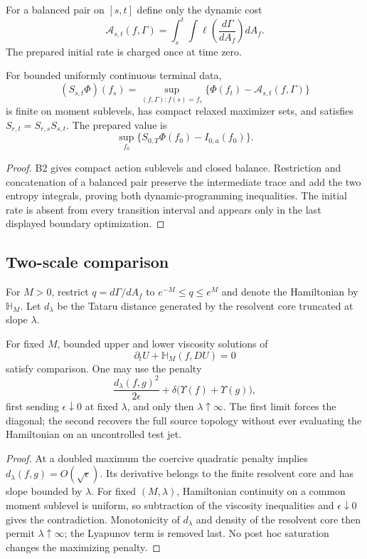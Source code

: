 For a balanced pair on $[s,t]$ define only the dynamic cost
\[
 \mathcal A_{s,t}(f,\Gamma)
 =\int_s^t\!\int
 \ell\left(\frac{d\Gamma}{dA_f}\right)dA_f.
\]
The prepared initial rate is charged once at time zero.

\begin{theorem}
\label{thm:r10-b4-action}
For bounded uniformly continuous terminal data,
\[
 (S_{s,t}\Phi)(f_s)
 =\sup_{(f,\Gamma):f(s)=f_s}
 \{\Phi(f_t)-\mathcal A_{s,t}(f,\Gamma)\}
\]
is finite on moment sublevels, has compact relaxed maximizer sets, and
satisfies $S_{r,t}=S_{r,s}S_{s,t}$.  The prepared value is
\[
 \sup_{f_0}\{S_{0,T}\Phi(f_0)-I_{0,a}(f_0)\}.
\]
\end{theorem}

\begin{proof}
B2 gives compact action sublevels and closed balance.  Restriction and
concatenation of a balanced pair preserve the intermediate trace and add the
two entropy integrals, proving both dynamic-programming inequalities.  The
initial rate is absent from every transition interval and appears only in the
last displayed boundary optimization.
\end{proof}

\subsection{Two-scale comparison}

For $M>0$, restrict $q=d\Gamma/dA_f$ to
$e^{-M}\le q\le e^M$ and denote the Hamiltonian by $\mathbb H_M$.  Let
$d_\lambda$ be the Tataru distance generated by the resolvent core truncated
at slope $\lambda$.

\begin{theorem}
\label{thm:r10-b4-comparison}
For fixed $M$, bounded upper and lower viscosity solutions of
\[
 \partial_tU+\mathbb H_M(f,DU)=0
\]
satisfy comparison.  One may use the penalty
\[
 \frac{d_\lambda(f,g)^2}{2\epsilon}
 +\delta\bigl(\Upsilon(f)+\Upsilon(g)\bigr),
\]
first sending $\epsilon\downarrow0$ at fixed $\lambda$, and only then
$\lambda\uparrow\infty$.  The first limit forces the diagonal; the second
recovers the full source topology without ever evaluating the Hamiltonian on
an uncontrolled test jet.
\end{theorem}

\begin{proof}
At a doubled maximum the coercive quadratic penalty implies
$d_\lambda(f,g)=O(\sqrt\epsilon)$.  Its derivative belongs to the finite
resolvent core and has slope bounded by $\lambda$.  For fixed $(M,\lambda)$,
Hamiltonian continuity on a common moment sublevel is uniform, so subtraction
of the viscosity inequalities and $\epsilon\downarrow0$ gives the
contradiction.  Monotonicity of $d_\lambda$ and density of the resolvent core
then permit $\lambda\uparrow\infty$; the Lyapunov term is removed last.  No
post hoc saturation changes the maximizing penalty.
\end{proof}

